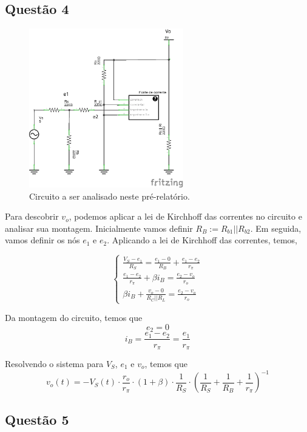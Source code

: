 \documentclass[12pt, a4paper, twoside]{article}
\begin{document}
\subsection{Questão 4}

\begin{figure}[H]
    \centering
    \includegraphics[width=0.6\textwidth]{figs/rel6/ex4.png}
    \caption{Circuito a ser analisado neste pré-relatório.}
\end{figure}

Para descobrir $v_o$, podemos aplicar a lei de Kirchhoff das correntes no circuito e analisar sua montagem. Inicialmente vamos definir $ R_B := R_{b1} || R_{b2} $. Em seguida, vamos definir os nós $e_1$ e $e_2$. Aplicando a lei de Kirchhoff das correntes, temos,

\begin{equation}
    \begin{cases}
        \frac{V_S-e_1}{R_S} = \frac{e_1 - 0}{R_B} + \frac{e_1-e_2}{r_\pi} \\
        \frac{e_1-e_2}{r_\pi} + \beta i_B = \frac{e_2 - v_o}{r_o} \\
        \beta i_B + \frac{v_o - 0}{R_C||R_L} = \frac{e_2 - v_o}{r_o}
    \end{cases}
\end{equation}

Da montagem do circuito, temos que
$$ e_2 = 0 $$
$$ i_B = \frac{e_1 - e_2}{r_\pi} = \frac{e_1}{r_\pi} $$

Resolvendo o sistema para $V_S$, $e_1$ e $v_o$, temos que
$$ v_o(t) = -V_S(t) \cdot \frac{r_o}{r_\pi} \cdot (1+\beta) \cdot \frac{1}{R_S} \cdot \left(\frac{1}{R_S} + \frac{1}{R_B} + \frac{1}{r_\pi} \right)^{-1} $$

\subsection{Questão 5}
\end{document}
